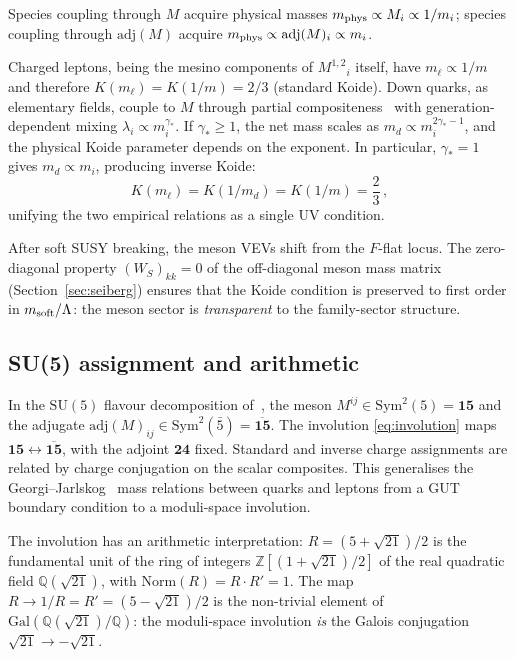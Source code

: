 \documentclass[12pt,a4paper]{article}
\newcommand{\SU}{\mathrm{SU}}
\newcommand{\adj}{\mathrm{adj}}
\begin{document}
Species coupling through $M$ acquire physical
masses $m_{\rm phys} \propto M_i \propto 1/m_i$; species coupling
through $\adj(M)$ acquire $m_{\rm phys} \propto \adj(M)_i
\propto m_i$.

Charged leptons, being the mesino components of $M^{1,2}{}_i$ itself,
have $m_\ell \propto 1/m$ and therefore $K(m_\ell) = K(1/m) = 2/3$
(standard Koide). Down quarks, as elementary fields, couple to $M$
through partial compositeness~\cite{Kaplan:1991dc} with
generation-dependent mixing $\lambda_i \propto m_i^{\gamma_*}$.
If $\gamma_* \geq 1$, the net mass scales as
$m_d \propto m_i^{2\gamma_*-1}$, and the physical Koide parameter
depends on the exponent. In particular, $\gamma_* = 1$ gives
$m_d \propto m_i$, producing inverse Koide:
\begin{equation}
  K(m_\ell) = K(1/m_d) = K(1/m) = \frac{2}{3}\,,
  \label{eq:koide_duality}
\end{equation}
unifying the two empirical relations as a single UV condition.

After soft SUSY breaking, the meson VEVs shift from the
$F$-flat locus. The zero-diagonal property $(W_S)_{kk} = 0$ of the
off-diagonal meson mass matrix (Section~\ref{sec:seiberg}) ensures
that the Koide condition is preserved to first order in
$m_{\rm soft}/\Lambda$: the meson sector is \emph{transparent} to the
family-sector structure.

\subsection{SU(5) assignment and arithmetic}

In the $\SU(5)$ flavour decomposition of~\cite{Rivero:2024epjc}, the
meson $M^{ij} \in \mathrm{Sym}^2(5) = \mathbf{15}$ and the adjugate
$\adj(M)_{ij} \in \mathrm{Sym}^2(\bar 5) =
\overline{\mathbf{15}}$. The involution \eqref{eq:involution} maps
$\mathbf{15} \leftrightarrow \overline{\mathbf{15}}$, with the
adjoint $\mathbf{24}$ fixed. Standard and inverse charge assignments
are related by charge conjugation on the scalar composites.
This generalises the Georgi--Jarlskog~\cite{GeorgiJarlskog:1979}
mass relations between quarks and leptons from a GUT boundary condition
to a moduli-space involution.

The involution has an arithmetic interpretation: $R = (5+\sqrt{21})/2$
is the fundamental unit of the ring of integers
$\mathbb{Z}[(1+\sqrt{21})/2]$ of the real quadratic field
$\mathbb{Q}(\sqrt{21})$, with $\mathrm{Norm}(R) = R\cdot R' = 1$.
The map $R \to 1/R = R' = (5-\sqrt{21})/2$ is the non-trivial element
of $\mathrm{Gal}(\mathbb{Q}(\sqrt{21})/\mathbb{Q})$: the moduli-space
involution \emph{is} the Galois conjugation $\sqrt{21}\to -\sqrt{21}$.
\end{document}
